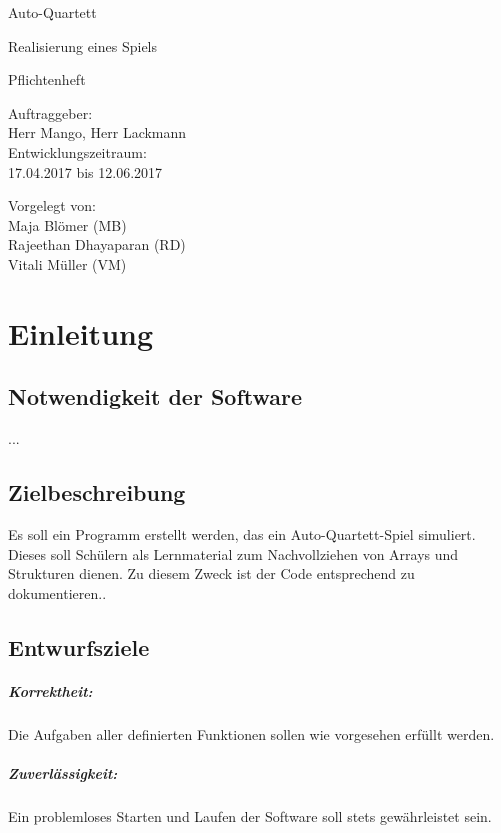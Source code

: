 \documentclass[11pt]{scrreprt}
\begin{document}
\begin{center}
\Huge
Auto-Quartett

\medskip
\large
Realisierung eines Spiels 

\vskip 1in
\Huge
Pflichtenheft

\large
\vskip 2in
Auftraggeber:\\
Herr Mango, Herr Lackmann\\
Entwicklungszeitraum:\\
17.04.2017 bis 12.06.2017

\large
\vskip 2in
Vorgelegt von:\\
Maja Blömer (MB)\\
Rajeethan Dhayaparan (RD)\\
Vitali Müller (VM)

\end{center}

\newpage
\tableofcontents

\newpage
\chapter{Einleitung}

\section{Notwendigkeit der Software}
\normalsize \normalfont \textnormal
...

\section{Zielbeschreibung}
Es soll ein Programm erstellt werden, das ein Auto-Quartett-Spiel simuliert. Dieses soll Schülern als Lernmaterial zum Nachvollziehen von Arrays und Strukturen dienen. Zu diesem Zweck ist der Code entsprechend zu dokumentieren..


\newpage

\section{Entwurfsziele}
\paragraph{Korrektheit:} Die Aufgaben aller definierten Funktionen sollen wie vorgesehen erfüllt werden.

\paragraph{Zuverlässigkeit:} Ein problemloses Starten und Laufen der Software soll stets gewährleistet sein.
\end{document}
